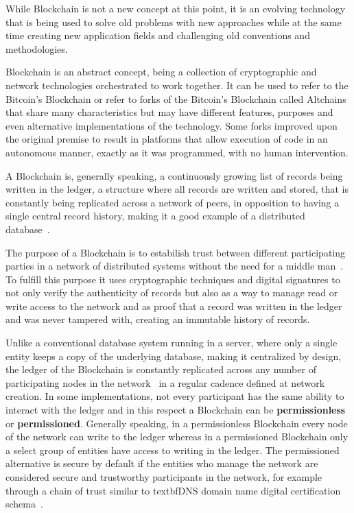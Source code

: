 While Blockchain is not a new concept at this point, it is an evolving
technology that is being used to solve old problems with new approaches while
at the same time creating new application fields and challenging old
conventions and methodologies.

Blockchain is an abstract concept, being a collection of cryptographic and
network technologies orchestrated to work together. It can be used to refer to
the Bitcoin's Blockchain or refer to forks of the Bitcoin's Blockchain called
Altchains~\cite{Lewis2015} that share many characteristics but may have
different features, purposes and even alternative implementations of the
technology. Some forks improved upon the original premise to result in
platforms that allow execution of code in an autonomous manner, exactly as it
was programmed, with no human intervention.

A Blockchain is, generally speaking, a continuously growing list of records
being written in the ledger, a structure where all records are written and
stored, that is constantly being replicated across a network of peers, in
opposition to having a single central record history, making it a good example
of a distributed database~\cite{Barclay2017}.

The purpose of a Blockchain is to estabilish trust between different
participating parties in a network of distributed systems without the need for
a middle man~\cite{Drescher2017}. To fulfill this purpose it uses cryptographic
techniques and digital signatures to not only verify the authenticity of
records but also as a way to manage read or write access to the network and as
proof that a record was written in the ledger and was never tampered with,
creating an immutable history of records.

Unlike a conventional database system running in a server, where only a single
entity keeps a copy of the underlying database, making it centralized by
design, the ledger of the Blockchain is constantly replicated across any number
of participating nodes in the network~\cite{Lewis2015} in a regular cadence
defined at network creation. In some implementations, not every participant has
the same ability to interact with the ledger and in this respect a Blockchain
can be \textbf{permissionless} or \textbf{permissioned}. Generally speaking, in
a permissionless Blockchain every node of the network can write to the ledger
whereas in a permissioned Blockchain only a select group of entities have
access to writing in the ledger. The permissioned alternative is secure by
default if the entities who manage the network are considered secure and
trustworthy participants in the network, for example through a chain of trust
similar to textbf{DNS} domain name digital certification
schema~\cite{Lewis2015,Valenta2017}.


